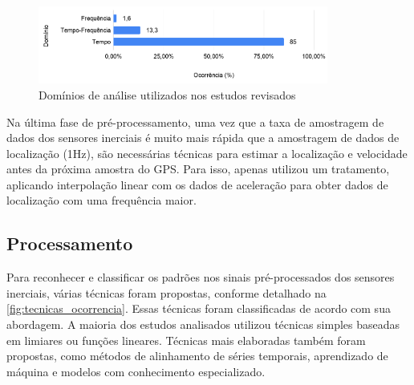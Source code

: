 \begin{figure}[h!]
  \centering
  \caption{Domínios de análise utilizados nos estudos revisados}
   \label{fig:dominios_analise_ocorrencia}
   \includegraphics[width=0.85\textwidth]{figuras/fig_18.png}
\end{figure}

Na última fase de pré-processamento, uma vez que a taxa de amostragem de dados dos sensores inerciais é muito mais rápida que a amostragem de dados de localização (1Hz), são necessárias técnicas para estimar a localização e velocidade antes da próxima amostra do GPS. Para isso, apenas \cite{Li2018} utilizou um tratamento, aplicando interpolação linear com os dados de aceleração para obter dados de localização com uma frequência maior. 

\subsection{Processamento}

Para reconhecer e classificar os padrões nos sinais pré-processados dos sensores inerciais, várias técnicas foram propostas, conforme detalhado na \autoref{fig:tecnicas_ocorrencia}. Essas técnicas foram classificadas de acordo com sua abordagem. A maioria dos estudos analisados utilizou técnicas simples baseadas em limiares ou funções lineares. Técnicas mais elaboradas também foram propostas, como métodos de alinhamento de séries temporais, aprendizado de máquina e modelos com conhecimento especializado.

